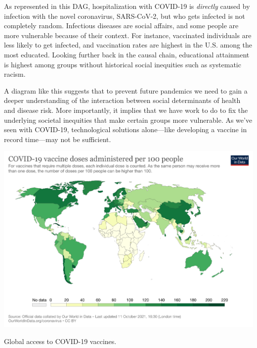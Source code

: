 \documentclass[
  letterpaper,
  DIV=11,
  numbers=noendperiod,
  oneside]{scrreprt}
\begin{document}
As represented in this DAG, hospitalization with COVID-19 is
\emph{directly} caused by infection with the novel coronavirus,
SARS-CoV-2, but who gets infected is not completely random. Infectious
diseases are social affairs, and some people are more vulnerable because
of their context. For instance, vaccinated individuals are less likely
to get infected, and vaccination rates are highest in the U.S. among the
most educated. Looking further back in the causal chain, educational
attainment is highest among groups without historical social inequities
such as systematic racism.

A diagram like this suggests that to prevent future pandemics we need to
gain a deeper understanding of the interaction between social
determinants of health and disease risk. More importantly, it implies
that we have work to do to fix the underlying societal inequities that
make certain groups more vulnerable. As we've seen with COVID-19,
technological solutions alone---like developing a vaccine in record
time---may not be sufficient.

\begin{marginfigure}

{\centering \includegraphics{./images/covid-vaccination-doses-per-capita.png}

}

\caption{\label{fig-covidvaccines}Global access to COVID-19 vaccines.}

\end{marginfigure}
\end{document}
